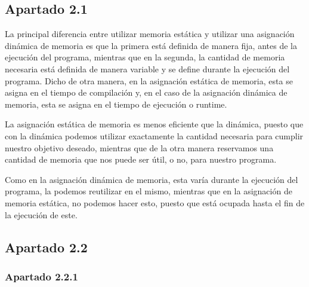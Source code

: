 \documentclass[spanish]{article}
\begin{document}
\subsection{Apartado 2.1}

La principal diferencia entre utilizar memoria estática y utilizar una
asignación dinámica de memoria es que la primera está definida de manera fija,
antes de la ejecución del programa, mientras que en la segunda, la cantidad de
memoria necesaria está definida de manera variable y se define durante la
ejecución del programa. Dicho de otra manera, en la asignación estática de
memoria, esta se asigna en el tiempo de compilación y, en el caso de la
asignación dinámica de memoria, esta se asigna en el tiempo de ejecución o
runtime.\newline

La asignación estática de memoria es menos eficiente que la dinámica, puesto que
con la dinámica podemos utilizar exactamente la cantidad necesaria para cumplir
nuestro objetivo deseado, mientras que de la otra manera reservamos una cantidad
de memoria que nos puede ser útil, o no, para nuestro programa.\newline

Como en la asignación dinámica de memoria, esta varía durante la ejecución del
programa, la podemos reutilizar en el mismo, mientras que en la asignación de
memoria estática, no podemos hacer esto, puesto que está ocupada hasta el fin de
la ejecución de este.\newline

\newpage

\subsection{Apartado 2.2}

\subsubsection{Apartado 2.2.1}
\end{document}
